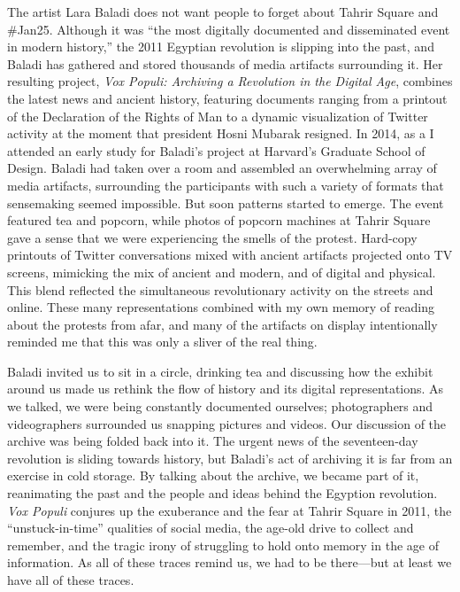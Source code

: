 The artist Lara Baladi does not want people to forget about Tahrir Square and \#Jan25. Although it was ``the most digitally documented and disseminated event in modern history,'' the 2011 Egyptian revolution is slipping into the past, and Baladi has gathered and stored thousands of media artifacts surrounding it.\autocite{baladi_vox_????} Her resulting project, \emph{Vox Populi: Archiving a Revolution in the Digital Age}, combines the latest news and ancient history, featuring documents ranging from a printout of the Declaration of the Rights of Man to a dynamic visualization of Twitter activity at the moment that president Hosni Mubarak resigned. In 2014, as a  I attended an early study for Baladi's project at Harvard's Graduate School of Design. Baladi had taken over a room and assembled an overwhelming array of media artifacts, surrounding the participants with such a variety of formats that sensemaking seemed impossible. But soon patterns started to emerge. The event featured tea and popcorn, while photos of popcorn machines at Tahrir Square gave a sense that we were experiencing the smells of the protest. Hard-copy printouts of Twitter conversations mixed with ancient artifacts projected onto TV screens, mimicking the mix of ancient and modern, and of digital and physical. This blend reflected the simultaneous revolutionary activity on the streets and online. These many representations combined with my own memory of reading about the protests from afar, and many of the artifacts on display intentionally reminded me that this was only a sliver of the real thing.

Baladi invited us to sit in a circle, drinking tea and discussing how the exhibit around us made us rethink the flow of history and its digital representations. As we talked, we were being constantly documented ourselves; photographers and videographers surrounded us snapping pictures and videos. Our discussion of the archive was being folded back into it. The urgent news of the seventeen-day revolution is sliding towards history, but Baladi's act of archiving it is far from an exercise in cold storage. By talking about the archive, we became part of it, reanimating the past and the people and ideas behind the Egyption revolution. \emph{Vox Populi} conjures up the exuberance and the fear at Tahrir Square in 2011, the ``unstuck-in-time'' qualities of social media, the age-old drive to collect and remember, and the tragic irony of struggling to hold onto memory in the age of information. As all of these traces remind us, we had to be there---but at least we have all of these traces.



